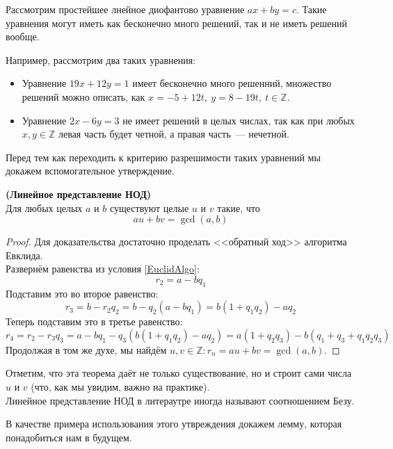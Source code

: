 \documentclass[11pt]{article}
\begin{document}
	Рассмотрим простейшее лнейное диофантово уравнение $ax + by = c$. Такие уравнения могут иметь как бесконечно много решений, так и не иметь
	решений вообще.
	\begin{example} Например, рассмотрим два таких уравнения:
		\begin{itemize}

			\item Уравнение $19x + 12y = 1$ имеет бесконечно много решенний, множество решений можно описать, как $x = -5 + 12t, \ y = 8 - 19t, \ t \in \mathbb{Z}$.\\

			\item Уравнение $2x - 6y = 3$ не имеет решений в целых числах, так как при любых $x, y \in \mathbb{Z}$ левая часть будет четной, а правая часть~--- нечетной.

		\end{itemize}
	\end{example}

	Перед тем как переходить к критерию разрешимости таких уравнений мы докажем  вспомогательное утверждение.

	\begin{theorem} \textbf{(Линейное представление НОД)}\label{LinearGCD}\\
		Для любых целых $a$ и $b$ существуют целые $u$ и $v$ такие, что
		\[ au + bv = \gcd(a, b) \]
	\end{theorem}
	\begin{proof}
	    Для доказательства достаточно проделать <<обратный ход>> алгоритма Евклида. \\
		Развернём равенства из условия \ref{EuclidAlgo}:
		\[ r_2 = a - bq_1\]
		Подставим это во второе равенство:
		\[ r_3 = b - r_2 q_2 = b - q_2(a - bq_1) = b(1 + q_1 q_2) - a q_2 \]
		Теперь подставим это в третье равенство:
		\[ r_4 = r_2 - r_3 q_3 = a - bq_1 -  q_3(b(1 + q_1 q_2) - a q_2) = a(1 + q_2 q_3) - b(q_1 + q_3 + q_1 q_2 q_3) \]
		Продолжая в том же духе, мы найдём $u, v \in \mathbb{Z}\colon r_n = au + bv = \gcd(a, b)$.
	\end{proof}
	\begin{remark}
	    Отметим, что эта теорема даёт не только существование, но и строит сами числа $u$ и $v$ (что, как мы увидим, важно
		на практике).\\
		Линейное представление НОД в литераутре иногда называют соотношением Безу.
	\end{remark}
	В качестве примера использования этого утвреждения докажем лемму, которая понадобиться нам в будущем.
\end{document}
